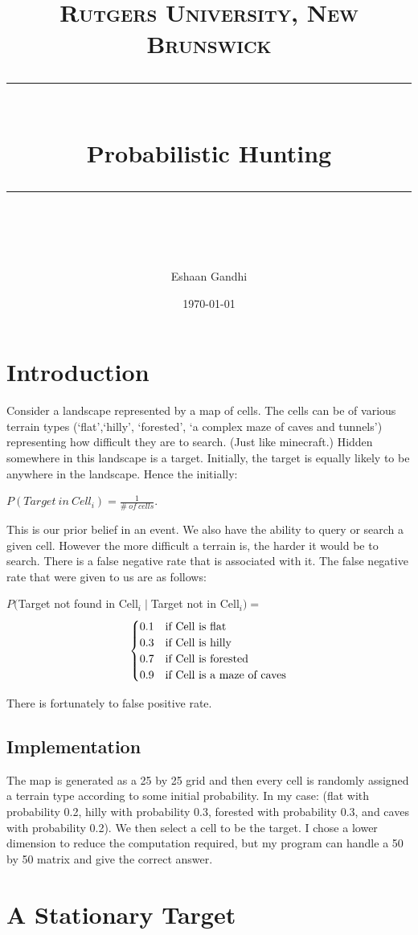 \documentclass[12pt]{article} %
\title{	
	\normalfont\normalsize
	\textsc{Rutgers University, New Brunswick}\\ %
	\vspace{25pt} %
	\rule{\linewidth}{0.5pt}\\ %
	\vspace{20pt} %
	{\huge Probabilistic Hunting}\\ %
	\vspace{12pt} %
	\rule{\linewidth}{2pt}\\ %
	\vspace{12pt} %
}
\author{\LARGE Eshaan Gandhi} %
\date{\normalsize\today} %
\begin{document}
\maketitle %

\section{Introduction}
Consider a landscape represented by a map of cells. The cells can be of various terrain types (‘flat’,‘hilly’, ‘forested’, ‘a complex maze of caves and tunnels’) representing how difficult they are to search. (Just like minecraft.) Hidden somewhere in this landscape is a target.  Initially, the target is equally likely to be anywhere in the landscape. Hence the initially:
\begin{center}
$P(Target\  in\  Cell_i) = \frac{1}{\#\ of\ cells}$. 
\end{center} 
This is our prior belief in an event. We also have the ability to query or search a given cell. However the more difficult a terrain is, the harder it would be to search. There is a false negative rate that is associated with it. The false negative rate that were given to us are as follows:
\begin{center}
$P($Target not found in Cell$_i\mid$Target not in Cell$_i) = $\[ \begin{cases}
0.1 & $if Cell is flat$ \\
      0.3 & $if Cell is hilly$ \\
      0.7 & $if Cell is forested$ \\
      0.9 & $if Cell is a maze of caves$
   \end{cases}
\]
\end{center}
There is fortunately to false positive rate.

\subsection{Implementation}
The map is generated as a 25 by 25 grid and then every cell is randomly assigned a terrain type according to some initial probability. In my case: (flat with probability 0.2,  hilly with probability 0.3,  forested with probability 0.3,  and caves with probability  0.2). We then select a cell to be the target. I chose a lower dimension to reduce the computation required, but my program can handle a 50 by 50 matrix and give the correct answer. 
\pagebreak
\section{A Stationary Target}
\ 
\end{document}
